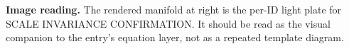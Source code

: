 \begin{samepage}
\noindent\begin{minipage}[t]{0.45\linewidth}
\vspace{0pt}
\raggedright
\scriptsize\textbf{Image reading.} The rendered manifold at right is the per-ID light plate for SCALE INVARIANCE CONFIRMATION. It should be read as the visual companion to the entry's equation layer, not as a repeated template diagram.\par
\end{minipage}\hfill
\begin{minipage}[t]{0.53\linewidth}
\vspace*{-0.10in}
\raggedright
{}
\end{minipage}
\end{samepage}

\clearpage


